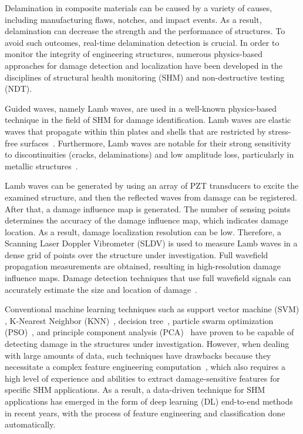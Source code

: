 \documentclass[runningheads]{llncs}
\begin{document}
Delamination in composite materials can be caused by a variety of causes, including manufacturing flaws, notches, and impact events.
As a result, delamination can decrease the strength and the performance of structures.
To avoid such outcomes, real-time delamination detection is crucial.
In order to monitor the integrity of engineering structures, numerous physics-based approaches for damage detection and localization have been developed in the disciplines of structural health monitoring (SHM) and non-destructive testing (NDT).

Guided waves, namely Lamb waves, are used in a well-known physics-based technique in the field of SHM for damage identification.
Lamb waves are elastic waves that propagate within thin plates and shells that are restricted by stress-free surfaces~\cite{mitra2016guided}.
Furthermore, Lamb waves are notable for their strong sensitivity to discontinuities (cracks, delaminations) and low amplitude loss, particularly in metallic structures~\cite{Keulen2014}.

Lamb waves can be generated by using an array of PZT transducers to excite the examined structure, and then the reflected waves from damage can be registered.
After that, a damage influence map is generated.
The number of sensing points determines the accuracy of the damage influence map, which indicates damage location.
As a result, damage localization resolution can be low.
Therefore, a Scanning Laser Doppler Vibrometer (SLDV) is used to measure Lamb waves in a dense grid of points over the structure under investigation.
Full wavefield propagation measurements are obtained, resulting in high-resolution damage influence maps.
Damage detection techniques that use full wavefield signals can accurately estimate the size and location of damage~\cite{Girolamo2018a}.

Conventional machine learning techniques such as support vector machine (SVM) \cite{noori2010application}, K-Nearest Neighbor (KNN)~\cite{Vitola2017}, decision tree~\cite{Mariniello2020}, particle swarm optimization (PSO)~\cite{Khatir2018}, and principle component analysis (PCA)~\cite{wang2014principal}
have proven to be capable of detecting damage in the structures under investigation.
However, when dealing with large amounts of data, such techniques have drawbacks because they necessitate a complex feature engineering computation~\cite{Gulgec2019}, which also requires a high level of experience and abilities to extract damage-sensitive features for specific SHM applications.
As a result, a data-driven technique for SHM applications has emerged in the form of deep learning (DL) end-to-end methods in recent years, with the process of feature engineering and classification done automatically.
\end{document}
